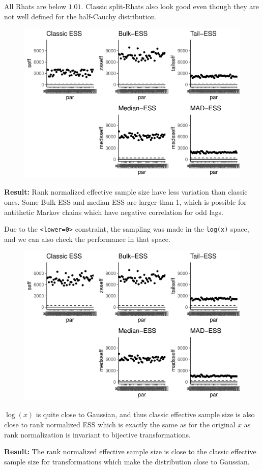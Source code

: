 \documentclass[american,]{article}
\begin{document}
All Rhats are below \(1.01\). Classic split-Rhats also look good even
though they are not well defined for the half-Cauchy distribution.

\begin{figure}[tp]
  \centering
  \includegraphics[width=0.6\linewidth]{graphics/ess-fit-half-nom-1.pdf}
\end{figure}

\textbf{Result:} Rank normalized effective sample size have less
variation than classic ones. Some Bulk-ESS and median-ESS are larger
than 1, which is possible for antithetic Markov chains which have
negative correlation for odd lags.

Due to the \texttt{\textless{}lower=0\textgreater{}} constraint, the
sampling was made in the \texttt{log(x)} space, and we can also check
the performance in that space.

\begin{figure}[tp]
  \centering
  \includegraphics[width=0.6\linewidth]{graphics/ess-fit-half-nom-2-1.pdf}
\end{figure}

\(\log(x)\) is quite close to Gaussian, and thus classic effective
sample size is also close to rank normalized ESS which is exactly the
same as for the original \(x\) as rank normalization is invariant to
bijective transformations.

\textbf{Result:} The rank normalized effective sample size is close to
the classic effective sample size for transformations which make the
distribution close to Gaussian.
\end{document}
